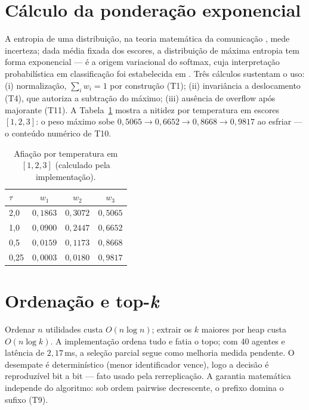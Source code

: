 \section{Cálculo da ponderação exponencial}
A entropia de uma distribuição, na teoria matemática da comunicação \cite{shannon1948}, mede incerteza; dada média fixada dos escores, a distribuição de máxima entropia tem forma exponencial \cite{jaynes1957} --- é a origem variacional do softmax, cuja interpretação probabilística em classificação foi estabelecida em \cite{bridle1990}. Três cálculos sustentam o uso: (i) normalização, $\sum_i w_i=1$ por construção (T1); (ii) invariância a deslocamento (T4), que autoriza a subtração do máximo; (iii) ausência de overflow após majorante (T11). A Tabela~\ref{tab:temp} mostra a nitidez por temperatura em escores $[1,2,3]$: o peso máximo sobe $0{,}5065\to0{,}6652\to0{,}8668\to0{,}9817$ ao esfriar --- o conteúdo numérico de T10.
\begin{table}[h]
\centering
\caption{Afiação por temperatura em $[1,2,3]$ (calculado pela implementação).}
\label{tab:temp}
\begin{tabular}{lccc}
\toprule
$\tau$ & $w_1$ & $w_2$ & $w_3$ \\
\midrule
2,0 & $0{,}1863$ & $0{,}3072$ & $0{,}5065$ \\
1,0 & $0{,}0900$ & $0{,}2447$ & $0{,}6652$ \\
0,5 & $0{,}0159$ & $0{,}1173$ & $0{,}8668$ \\
0,25 & $0{,}0003$ & $0{,}0180$ & $0{,}9817$ \\
\bottomrule
\end{tabular}
\end{table}
\section{Ordenação e top-\textit{k}}
Ordenar $n$ utilidades custa $O(n\log n)$; extrair os $k$ maiores por heap custa $O(n\log k)$. A implementação ordena tudo e fatia o topo; com 40 agentes e latência de $2{,}17$\,ms, a seleção parcial segue como melhoria medida pendente. O desempate é determinístico (menor identificador vence), logo a decisão é reproduzível bit a bit --- fato usado pela rerreplicação. A garantia matemática independe do algoritmo: sob ordem pairwise decrescente, o prefixo domina o sufixo (T9).
